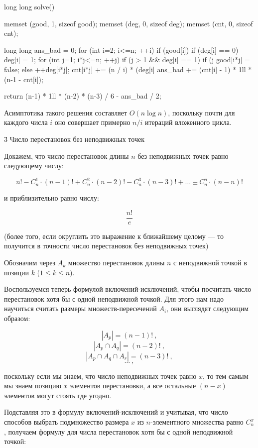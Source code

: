 long long solve() {
	memset (good, 1, sizeof good);
	memset (deg, 0, sizeof deg);
	memset (cnt, 0, sizeof cnt);

	long long ans_bad = 0;
	for (int i=2; i<=n; ++i) {
		if (good[i]) {
			if (deg[i] == 0)  deg[i] = 1;
			for (int j=1; i*j<=n; ++j) {
				if (j > 1 && deg[i] == 1)
					if (j %
						good[i*j] = false;
					else
						++deg[i*j];
				cnt[i*j] += (n / i) * (deg[i]%
			}
		}
		ans_bad += (cnt[i] - 1) * 1ll * (n-1 - cnt[i]);
	}

	return (n-1) * 1ll * (n-2) * (n-3) / 6 - ans_bad / 2;
}
\endcode

Асимптотика такого решения составляет $O (n \log n)$, поскольку почти для каждого числа $i$ оно совершает примерно $n/i$ итераций вложенного цикла.


\h3{ Число перестановок без неподвижных точек }

Докажем, что число перестановок длины $n$ без неподвижных точек равно следующему числу:

$$ n! - C_n^1 \cdot (n-1)! + C_n^2 \cdot (n-2)! - C_n^3 \cdot (n-3)! + \ldots \pm C_n^n \cdot (n-n)! $$

и приблизительно равно числу:

$$ \frac{ n! }{ e } $$

(более того, если округлить это выражение к ближайшему целому --- то получится в точности число перестановок без неподвижных точек)

Обозначим через $A_k$ множество перестановок длины $n$ с неподвижной точкой в позиции $k$ ($1 \le k \le n$).

Воспользуемся теперь формулой включений-исключений, чтобы посчитать число перестановок хотя бы с одной неподвижной точкой. Для этого нам надо научиться считать размеры множеств-пересечений $A_i$, они выглядят следующим образом:

$$ \left| A_p \right| = (n-1)! ~, $$
$$ \left| A_p \cap A_q \right| = (n-2)! ~, $$
$$ \left| A_p \cap A_q \cap A_r \right| = (n-3)! ~, $$
$$ \ldots ~, $$

поскольку если мы знаем, что число неподвижных точек равно $x$, то тем самым мы знаем позицию $x$ элементов перестановки, а все остальные $(n-x)$ элементов могут стоять где угодно.

Подставляя это в формулу включений-исключений и учитывая, что число способов выбрать подмножество размера $x$ из $n$-элементного множества равно $C_n^x$, получаем формулу для числа перестановок хотя бы с одной неподвижной точкой:

